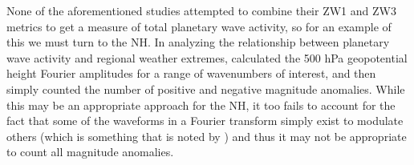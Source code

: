 None of the aforementioned studies attempted to combine their ZW1 and ZW3 metrics to get a measure of total planetary wave activity, so for an example of this we must turn to the NH. In analyzing the relationship between planetary wave activity and regional weather extremes, \citet{Screen2014} calculated the 500 hPa geopotential height Fourier amplitudes for a range of wavenumbers of interest, and then simply counted the number of positive and negative magnitude anomalies. While this may be an appropriate approach for the NH, it too fails to account for the fact that some of the waveforms in a Fourier transform simply exist to modulate others (which is something that is noted by \citet{Screen2014}) and thus it may not be appropriate to count all magnitude anomalies.  